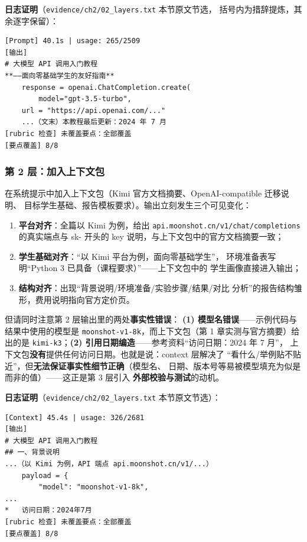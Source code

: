 \textbf{日志证明}（\nolinkurl{evidence/ch2/02_layers.txt} 本节原文节选，
括号内为措辞提炼，其余逐字保留）：

\begin{verbatim}
[Prompt] 40.1s | usage: 265/2509
[输出]
# 大模型 API 调用入门教程
**——面向零基础学生的友好指南**
    response = openai.ChatCompletion.create(
        model="gpt-3.5-turbo",
    url = "https://api.openai.com/..."
    ...（文末）本教程最后更新：2024 年 7 月
[rubric 检查] 未覆盖要点：全部覆盖
[要点覆盖] 8/8
\end{verbatim}

\subsubsection{第 2 层：加入上下文包}

在系统提示中加入上下文包（Kimi 官方文档摘要、OpenAI-compatible 迁移说明、
目标学生基础、报告模板要求）。输出立刻发生三个可见变化：
\begin{enumerate}[leftmargin=4em,itemsep=0pt,topsep=2pt]
    \item \textbf{平台对齐}：全篇以 Kimi 为例，给出
          \nolinkurl{api.moonshot.cn/v1/chat/completions} 的真实端点与
          sk- 开头的 key 说明，与上下文包中的官方文档摘要一致；
    \item \textbf{学生基础对齐}：``以 Kimi 平台为例，面向零基础学生''，
          环境准备表写明``Python 3 已具备（课程要求）''——上下文包中的
          学生画像直接进入输出；
    \item \textbf{结构对齐}：出现``背景说明/环境准备/实验步骤/结果/对比
          分析''的报告结构雏形，费用说明指向官方定价页。
\end{enumerate}
但请同时注意第 2 层输出里的两处\textbf{事实性错误}：
\textbf{(1) 模型名错误}——示例代码与结果中使用的模型是
\texttt{moonshot-v1-8k}，而上下文包（第 1 章实测与官方摘要）给出的是
\texttt{kimi-k3}；\textbf{(2) 引用日期编造}——参考资料``访问日期：2024 年 7 月''，
上下文包\textbf{没有}提供任何访问日期。也就是说：context 层解决了
``看什么/举例贴不贴近''，但\textbf{无法保证事实性细节正确}（模型名、
日期、版本号等易被模型填充为似是而非的值）——这正是第 3 层引入
\textbf{外部校验与测试}的动机。

\textbf{日志证明}（\nolinkurl{evidence/ch2/02_layers.txt} 本节原文节选）：

\begin{verbatim}
[Context] 45.4s | usage: 326/2681
[输出]
# 大模型 API 调用入门教程
## 一、背景说明
...（以 Kimi 为例，API 端点 api.moonshot.cn/v1/...）
    payload = {
        "model": "moonshot-v1-8k",
...
*   访问日期：2024年7月
[rubric 检查] 未覆盖要点：全部覆盖
[要点覆盖] 8/8
\end{verbatim}

